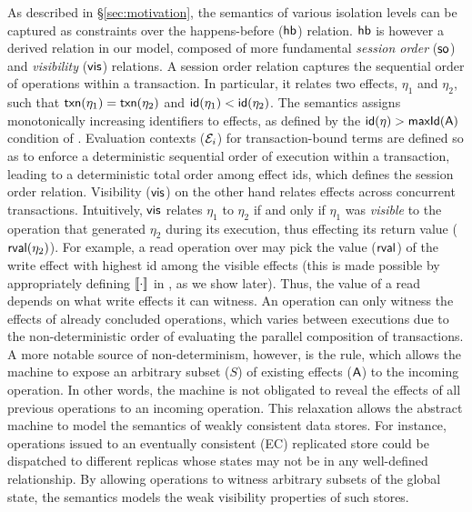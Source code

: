 As described in \S\ref{sec:motivation}, the semantics of various
isolation levels can be captured as constraints over the
happens-before ($\textsf{hb}$) relation. $\textsf{hb}$ is however a derived relation
in our model, composed of more fundamental \emph{session order}
($\textsf{so}$) and \emph{visibility} ($\textsf{vis}$) relations.  A session order
relation captures the sequential order of operations within a
transaction. In particular, it relates two effects, $\eta_1$ and
$\eta_2$, such that $\textsf{txn}(\eta_1) = \textsf{txn}(\eta_2)$ and $\textsf{id}(\eta_1) <
\textsf{id}(\eta_2)$.  The semantics assigns monotonically increasing
identifiers to effects, as defined by the $\textsf{id}(\eta) > \textsf{maxId}(\textsf{A})$
condition of .  Evaluation contexts ($\mathcal{E}_i$) for
transaction-bound terms are defined so as to enforce a deterministic
sequential order of execution within a transaction, leading to a
deterministic total order among effect ids, which defines the session
order relation. Visibility ($\textsf{vis}$) on the other hand relates effects
across concurrent transactions.  Intuitively, $\textsf{vis}$ relates $\eta_1$
to $\eta_2$ if and only if $\eta_1$ was \emph{visible} to the
operation that generated $\eta_2$ during its execution, thus effecting
its return value ($\textsf{rval}(\eta_2)$). For example, a read operation over
 may pick the value ($\textsf{rval}$) of the write effect with highest id
among the visible effects (this is made possible by appropriately
defining $\llbracket \cdot \rrbracket$ in , as we show
later). Thus, the value of a read depends on what write effects it can
witness. An operation can only witness the effects of already
concluded operations, which varies between executions due to the
non-deterministic order of evaluating the parallel composition of
transactions. A more notable source of non-determinism, however, is
the  rule, which allows the machine to expose an
arbitrary subset ($S$) of existing effects ($\textsf{A}$) to the incoming
operation. In other words, the machine is not obligated to reveal the
effects of all previous operations to an incoming operation. This
relaxation allows the abstract machine to model the semantics of
weakly consistent data stores. For instance, operations issued to an
eventually consistent (EC) replicated store could be dispatched to
different replicas whose states may not be in any well-defined
relationship. By allowing operations to witness arbitrary subsets of
the global state, the semantics models the weak visibility properties
of such stores.

